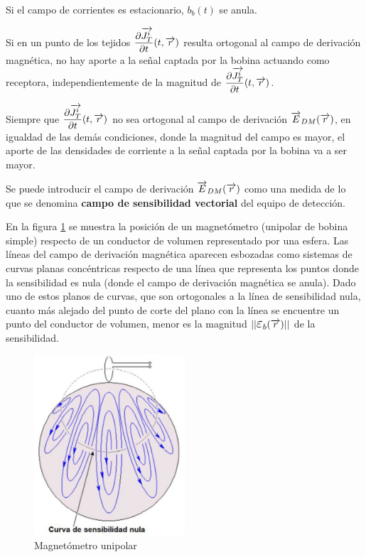 Si el campo de corrientes es estacionario, $b_{b}(t)$ se anula.

Si en un punto de los tejidos ${\dfrac{\partial \overrightarrow{J_{T}^{i}}}{\partial t}(t, \overrightarrow{r})}$ resulta ortogonal al campo de derivación magnética, no hay aporte a la señal captada por la bobina actuando como receptora, independientemente de la magnitud de ${\dfrac{\partial \overrightarrow{J_{T}^{i}}}{\partial t}(t, \overrightarrow{r})}$.

Siempre que ${\dfrac{\partial \overrightarrow{J_{T}^{i}}}{\partial t}(t, \overrightarrow{r})}$ no sea ortogonal al campo de derivación $\overrightarrow{E}_{DM}(\overrightarrow{r})$, en igualdad de las demás condiciones, donde la magnitud del campo es mayor, el aporte de las densidades de corriente a la señal captada por la bobina va a ser mayor.

Se puede introducir el campo de derivación $\overrightarrow{E}_{DM}(\overrightarrow{r})$ como una medida de lo que se denomina \textbf{campo de sensibilidad vectorial} del equipo de detección.


En la figura \ref{fig:616} se muestra la posición de un magnetómetro (unipolar de bobina simple) respecto de un conductor de volumen representado por una esfera. Las líneas del campo de derivación magnética aparecen esbozadas como sistemas de curvas planas concéntricas respecto de una línea que representa los puntos donde la sensibilidad es nula (donde el campo de derivación magnética se anula). Dado uno de estos planos de curvas, que son ortogonales a la línea de sensibilidad nula, cuanto más alejado del punto de corte del plano con la línea se encuentre un punto del conductor de volumen, menor es la magnitud $\vert\vert \Bb{\varepsilon}_{b}(\V{r}) \vert\vert$ de la sensibilidad.

\begin{figure}[H]
    \centering
    \includegraphics[width=0.5\textwidth]{./Figures/fig616}
	\caption{Magnetómetro unipolar}
	\label{fig:616}
\end{figure}


